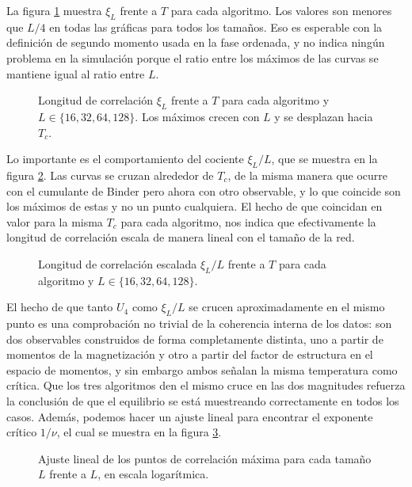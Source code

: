 La figura \ref{fig:xi} muestra $\xi_L$ frente a $T$ para cada algoritmo. Los valores son menores que $L/4$ en todas las gráficas para todos los tamaños. Eso es esperable con la definición de segundo momento usada en la fase ordenada, y no indica ningún problema en la simulación porque el ratio entre los máximos de las curvas se mantiene igual al ratio entre $L$.

\begin{figure}
  \centering
  
  \caption{Longitud de correlación $\xi_L$ frente a $T$ para cada algoritmo y $L \in \{16, 32, 64, 128\}$. Los máximos crecen con $L$ y se desplazan hacia $T_c$.}
  \label{fig:xi}
\end{figure}

Lo importante es el comportamiento del cociente $\xi_L / L$, que se muestra en la figura \ref{fig:xi_ratio}. Las curvas se cruzan alrededor de $T_c$, de la misma manera que ocurre con el cumulante de Binder pero ahora con otro observable, y lo que coincide son los máximos de estas y no un punto cualquiera. El hecho de que coincidan en valor para la misma $T_c$ para cada algoritmo, nos indica que efectivamente la longitud de correlación escala de manera lineal con el tamaño de la red.

\begin{figure}
  \centering
  
  \caption{Longitud de correlación escalada $\xi_L/L$ frente a $T$ para cada algoritmo y $L \in \{16, 32, 64, 128\}$.}
  \label{fig:xi_ratio}
\end{figure}

El hecho de que tanto $U_4$ como $\xi_L/L$ se crucen aproximadamente en el mismo punto es una comprobación no trivial de la coherencia interna de los datos: son dos observables construidos de forma completamente distinta, uno a partir de momentos de la magnetización y otro a partir del factor de estructura en el espacio de momentos, y sin embargo ambos señalan la misma temperatura como crítica. Que los tres algoritmos den el mismo cruce en las dos magnitudes refuerza la conclusión de que el equilibrio se está muestreando correctamente en todos los casos. Además, podemos hacer un ajuste lineal para encontrar el exponente crítico $1/\nu$, el cual se muestra en la figura \ref{fig:xi_scaling}.

\begin{figure}
  \centering
  
  \caption{Ajuste lineal de los puntos de correlación máxima para cada tamaño $L$ frente a $L$, en escala logarítmica.}
  \label{fig:xi_scaling}
\end{figure}

